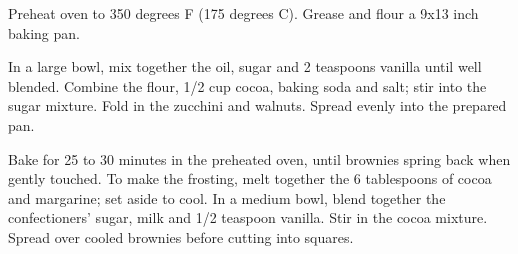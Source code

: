 
\info[servings=24,
		time = 45, 
		energy = 209, 
		urlsource = http://allrecipes.com/recipe/25112/zucchini-brownies/]{}

\begin{ingredients}
\end{ingredients}

\begin{preparation}
	\step Preheat oven to 350 degrees F (175 degrees C). Grease and flour a 9x13 inch baking pan.
	
	\step In a large bowl, mix together the oil, sugar and 2 teaspoons vanilla until well blended. Combine the flour, 1/2 cup cocoa, baking soda and salt; stir into the sugar mixture. Fold in the zucchini and walnuts. Spread evenly into the prepared pan.
	
	\step Bake for 25 to 30 minutes in the preheated oven, until brownies spring back when gently touched. To make the frosting, melt together the 6 tablespoons of cocoa and margarine; set aside to cool. In a medium bowl, blend together the confectioners' sugar, milk and 1/2 teaspoon vanilla. Stir in the cocoa mixture. Spread over cooled brownies before cutting into squares.
\end{preparation}


\begin{notes}
\end{notes}


